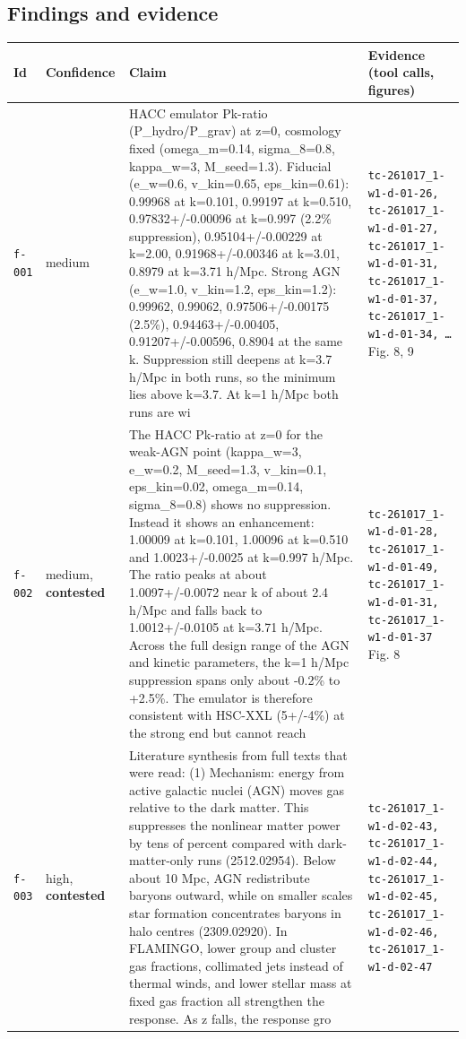 \documentclass[11pt,a4paper]{article}
\begin{document}
\subsection{Findings and evidence}
\begin{longtable}{@{}p{}p{}p{}p{}@{}}
\toprule Id & Confidence & Claim & Evidence (tool calls, figures) \\ \midrule \endhead
\texttt{f-001} & medium & HACC emulator Pk-ratio (P\_hydro/P\_grav) at z=0, cosmology fixed (omega\_m=0.14, sigma\_8=0.8, kappa\_w=3, M\_seed=1.3). Fiducial (e\_w=0.6, v\_kin=0.65, eps\_kin=0.61): 0.99968 at k=0.101, 0.99197 at k=0.510, 0.97832+/-0.00096 at k=0.997 (2.2\% suppression), 0.95104+/-0.00229 at k=2.00, 0.91968+/-0.00346 at k=3.01, 0.8979 at k=3.71 h/Mpc. Strong AGN (e\_w=1.0, v\_kin=1.2, eps\_kin=1.2): 0.99962, 0.99062, 0.97506+/-0.00175 (2.5\%), 0.94463+/-0.00405, 0.91207+/-0.00596, 0.8904 at the same k. Suppression still deepens at k=3.7 h/Mpc in both runs, so the minimum lies above k=3.7. At k=1 h/Mpc both runs are wi & \texttt{tc-261017\_\allowbreak{}1-w1-d-01-26,\allowbreak{} tc-261017\_\allowbreak{}1-w1-d-01-27,\allowbreak{} tc-261017\_\allowbreak{}1-w1-d-01-31,\allowbreak{} tc-261017\_\allowbreak{}1-w1-d-01-37,\allowbreak{} tc-261017\_\allowbreak{}1-w1-d-01-34,\allowbreak{} \ldots{}\allowbreak{}} Fig. 8, 9 \\
\texttt{f-002} & medium, \textbf{contested} & The HACC Pk-ratio at z=0 for the weak-AGN point (kappa\_w=3, e\_w=0.2, M\_seed=1.3, v\_kin=0.1, eps\_kin=0.02, omega\_m=0.14, sigma\_8=0.8) shows no suppression. Instead it shows an enhancement: 1.00009 at k=0.101, 1.00096 at k=0.510 and 1.0023+/-0.0025 at k=0.997 h/Mpc. The ratio peaks at about 1.0097+/-0.0072 near k of about 2.4 h/Mpc and falls back to 1.0012+/-0.0105 at k=3.71 h/Mpc. Across the full design range of the AGN and kinetic parameters, the k=1 h/Mpc suppression spans only about -0.2\% to +2.5\%. The emulator is therefore consistent with HSC-XXL (5+/-4\%) at the strong end but cannot reach  & \texttt{tc-261017\_\allowbreak{}1-w1-d-01-28,\allowbreak{} tc-261017\_\allowbreak{}1-w1-d-01-49,\allowbreak{} tc-261017\_\allowbreak{}1-w1-d-01-31,\allowbreak{} tc-261017\_\allowbreak{}1-w1-d-01-37} Fig. 8 \\
\texttt{f-003} & high, \textbf{contested} & Literature synthesis from full texts that were read: (1) Mechanism: energy from active galactic nuclei (AGN) moves gas relative to the dark matter. This suppresses the nonlinear matter power by tens of percent compared with dark-matter-only runs (2512.02954). Below about 10 Mpc, AGN redistribute baryons outward, while on smaller scales star formation concentrates baryons in halo centres (2309.02920). In FLAMINGO, lower group and cluster gas fractions, collimated jets instead of thermal winds, and lower stellar mass at fixed gas fraction all strengthen the response. As z falls, the response gro & \texttt{tc-261017\_\allowbreak{}1-w1-d-02-43,\allowbreak{} tc-261017\_\allowbreak{}1-w1-d-02-44,\allowbreak{} tc-261017\_\allowbreak{}1-w1-d-02-45,\allowbreak{} tc-261017\_\allowbreak{}1-w1-d-02-46,\allowbreak{} tc-261017\_\allowbreak{}1-w1-d-02-47} \\

\end{longtable}
\end{document}
